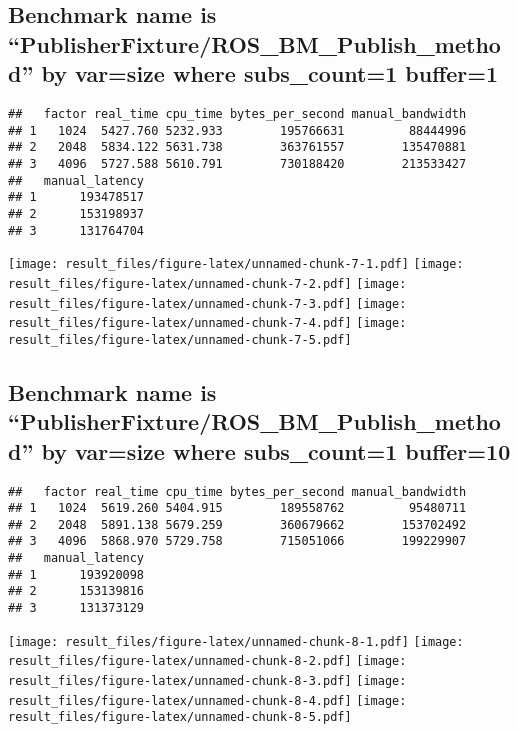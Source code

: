 \documentclass[]{article}
\begin{document}
\hypertarget{benchmark-name-is-publisherfixtureros_bm_publish_method-by-varsize-where-subs_count1-buffer1}{%
\subsection{Benchmark name is
``PublisherFixture/ROS\_BM\_Publish\_method'' by var=size where
subs\_count=1
buffer=1}\label{benchmark-name-is-publisherfixtureros_bm_publish_method-by-varsize-where-subs_count1-buffer1}}

\begin{verbatim}
##   factor real_time cpu_time bytes_per_second manual_bandwidth
## 1   1024  5427.760 5232.933        195766631         88444996
## 2   2048  5834.122 5631.738        363761557        135470881
## 3   4096  5727.588 5610.791        730188420        213533427
##   manual_latency
## 1      193478517
## 2      153198937
## 3      131764704
\end{verbatim}

\texttt{[image: result\_files/figure-latex/unnamed-chunk-7-1.pdf]}
\texttt{[image: result\_files/figure-latex/unnamed-chunk-7-2.pdf]}
\texttt{[image: result\_files/figure-latex/unnamed-chunk-7-3.pdf]}
\texttt{[image: result\_files/figure-latex/unnamed-chunk-7-4.pdf]}
\texttt{[image: result\_files/figure-latex/unnamed-chunk-7-5.pdf]}

\hypertarget{benchmark-name-is-publisherfixtureros_bm_publish_method-by-varsize-where-subs_count1-buffer10}{%
\subsection{Benchmark name is
``PublisherFixture/ROS\_BM\_Publish\_method'' by var=size where
subs\_count=1
buffer=10}\label{benchmark-name-is-publisherfixtureros_bm_publish_method-by-varsize-where-subs_count1-buffer10}}

\begin{verbatim}
##   factor real_time cpu_time bytes_per_second manual_bandwidth
## 1   1024  5619.260 5404.915        189558762         95480711
## 2   2048  5891.138 5679.259        360679662        153702492
## 3   4096  5868.970 5729.758        715051066        199229907
##   manual_latency
## 1      193920098
## 2      153139816
## 3      131373129
\end{verbatim}

\texttt{[image: result\_files/figure-latex/unnamed-chunk-8-1.pdf]}
\texttt{[image: result\_files/figure-latex/unnamed-chunk-8-2.pdf]}
\texttt{[image: result\_files/figure-latex/unnamed-chunk-8-3.pdf]}
\texttt{[image: result\_files/figure-latex/unnamed-chunk-8-4.pdf]}
\texttt{[image: result\_files/figure-latex/unnamed-chunk-8-5.pdf]}
\end{document}
